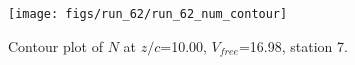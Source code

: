 \begin{figure}[H]
\centering
\texttt{[image: figs/run\_62/run\_62\_num\_contour]}
\caption{Contour plot of $N$ at $z/c$=10.00, $V_{free}$=16.98, station 7.}
\label{fig:run_62_num_contour}
\end{figure}


